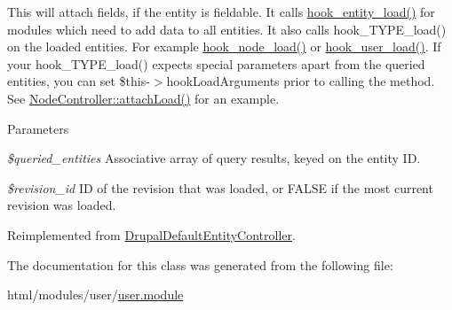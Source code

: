 This will attach fields, if the entity is fieldable. It calls \hyperlink{group__hooks_ga1f594647c8cbb27f75b77cc4118da8d6}{hook\_\-entity\_\-load()} for modules which need to add data to all entities. It also calls hook\_\-TYPE\_\-load() on the loaded entities. For example \hyperlink{group__node__api__hooks_gad48bb14b68ed38526029d1f7ac2d2de4}{hook\_\-node\_\-load()} or \hyperlink{group__hooks_ga81027843e38de3a899fa6e72f876d6b6}{hook\_\-user\_\-load()}. If your hook\_\-TYPE\_\-load() expects special parameters apart from the queried entities, you can set \$this-\/$>$hookLoadArguments prior to calling the method. See \hyperlink{classNodeController_abdc7525854d61d63fa6ee79bb2409359}{NodeController::attachLoad()} for an example.


\begin{DoxyParams}{Parameters}
\item[{\em \$queried\_\-entities}]Associative array of query results, keyed on the entity ID. \item[{\em \$revision\_\-id}]ID of the revision that was loaded, or FALSE if the most current revision was loaded. \end{DoxyParams}


Reimplemented from \hyperlink{classDrupalDefaultEntityController_a68735c41d2ba655a073c64983754edf7}{DrupalDefaultEntityController}.

The documentation for this class was generated from the following file:\begin{DoxyCompactItemize}
\item 
html/modules/user/\hyperlink{user_8module}{user.module}\end{DoxyCompactItemize}
